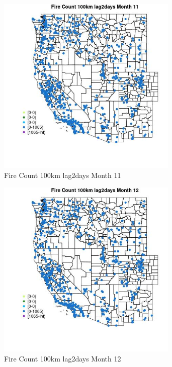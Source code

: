 \begin{figure} 
\centering  
\includegraphics[width=0.77\textwidth]{Code_Outputs/Report_ML_input_PM25_Step4_part_f_de_duplicated_aveswNAs_MapObsMo11Fire_Count_100km_lag2days.jpg} 
\caption{\label{fig:Report_ML_input_PM25_Step4_part_f_de_duplicated_aveswNAsMapObsMo11Fire_Count_100km_lag2days}Fire Count 100km lag2days Month 11} 
\end{figure} 
 

\begin{figure} 
\centering  
\includegraphics[width=0.77\textwidth]{Code_Outputs/Report_ML_input_PM25_Step4_part_f_de_duplicated_aveswNAs_MapObsMo12Fire_Count_100km_lag2days.jpg} 
\caption{\label{fig:Report_ML_input_PM25_Step4_part_f_de_duplicated_aveswNAsMapObsMo12Fire_Count_100km_lag2days}Fire Count 100km lag2days Month 12} 
\end{figure} 
 

